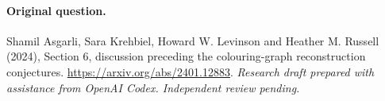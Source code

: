 \documentclass[11pt]{article}
\begin{document}
\paragraph{Original question.} Shamil Asgarli, Sara Krehbiel, Howard W. Levinson and Heather M. Russell (2024), Section 6, discussion preceding the colouring-graph reconstruction conjectures. \url{https://arxiv.org/abs/2401.12883}.
\medskip\noindent\textit{Research draft prepared with assistance from OpenAI Codex. Independent review pending.}
\end{document}

